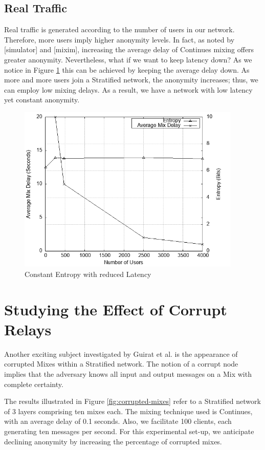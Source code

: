 \documentclass[logo,msc,cyber]{infthesis}   %
\begin{document}
\subsection{Real Traffic}

Real traffic is generated according to the number of users in our network.
Therefore, more users imply higher anonymity levels. In fact, as noted by
[simulator] and [mixim], increasing the average delay of Continues mixing offers
greater anonymity. Nevertheless, what if we want to keep latency down? As we
notice in Figure \ref{fig:nym-stratified-low-latency-constant-anonymity} this
can be achieved by keeping the average delay down. As more and more users join a
Stratified network, the anonymity increases; thus, we can employ low mixing
delays. As a result, we have a network with low latency yet constant anonymity.

\begin{figure}[h!]
    \centering
    \includegraphics[height=8cm]{figures/simulator/5.png}
    \caption{Constant Entropy with reduced Latency}
    \label{fig:nym-stratified-low-latency-constant-anonymity}
 \end{figure}

\section{Studying the Effect of Corrupt Relays}

Another exciting subject investigated by Guirat et al. is the appearance of
corrupted Mixes within a Stratified network. The notion of a corrupt node
implies that the adversary knows all input and output messages on a Mix with
complete certainty. 

The results illustrated in Figure \ref{fig:corrupted-mixes} refer to a
Stratified network of 3 layers comprising ten mixes each. The mixing technique
used is Continues, with an average delay of 0.1 seconds. Also, we facilitate 100
clients, each generating ten messages per second. For this experimental set-up,
we anticipate declining anonymity by increasing the percentage of corrupted
mixes. 
\end{document}
